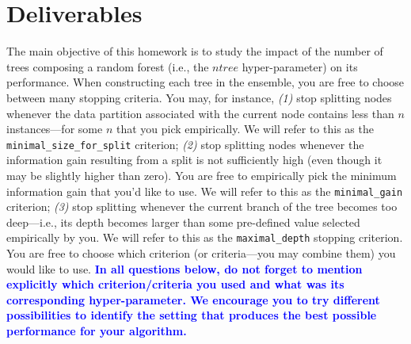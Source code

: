 \documentclass[letterpaper]{article}
\newcommand{\HIGHLIGHT}[1]{\textcolor{blue}{\textbf{#1}}}
\begin{document}
\section{Deliverables}

The main objective of this homework is to study the impact of the number of trees composing a random forest (i.e., the $ntree$ hyper-parameter) on its performance. When constructing each tree in the ensemble, you are free to choose between many stopping criteria. You may, for instance, \textit{(1)} stop splitting nodes whenever the data partition associated with the current node contains less than $n$ instances---for some $n$ that you pick empirically. We will refer to this as the \texttt{minimal\_size\_for\_split} criterion; \textit{(2)} stop splitting nodes whenever the information gain resulting from a split is not sufficiently high (even though it may be slightly higher than zero). You are free to empirically pick the minimum information gain that you'd like to use. We will refer to this as the 
\texttt{minimal\_gain} criterion; \textit{(3)} stop splitting whenever the current branch of the tree becomes too deep---i.e., its depth becomes larger than some pre-defined value selected empirically by you. We will refer to this as the \texttt{maximal\_depth}  stopping criterion. You are free to choose which criterion (or criteria---you may combine them) you would like to use. \HIGHLIGHT{In all questions below, do not forget to mention explicitly which criterion/criteria you used and what was its corresponding hyper-parameter. We encourage you to try different possibilities to identify the setting that produces the best possible performance for your algorithm.}

\vspace{2cm}
\end{document}
